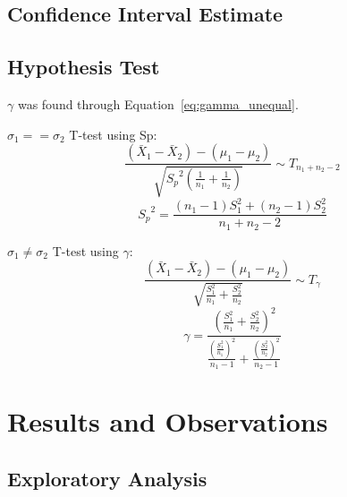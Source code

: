 \documentclass{article}
\begin{document}
\subsection{Confidence Interval Estimate}



\subsection{Hypothesis Test}

$\gamma$ was found through Equation~\ref{eq:gamma_unequal}.


$\sigma_1 == \sigma_2$ T-test using Sp:
\begin{equation}
	\frac{(\bar{X}_1 - \bar{X}_2) - (\mu_1 - \mu_2)}{\sqrt{{S_p}^2
	\left(\frac{1}{n_1} + \frac{1}{n_2} \right)}} \sim T_{n_1 + n_2 -2}
	\label{eq:t-test_equal}
\end{equation}
\begin{equation}
	{S_p}^2 = \frac{(n_1 - 1) S_1^2 + (n_2 -1) S_2^2}{n_1 + n_2 -2}
	\label{eq:pool_sample_variance}
\end{equation}

\noindent $\sigma_1 \neq \sigma_2$ T-test using $\gamma$:
\begin{equation}
	\frac{(\bar{X}_1 - \bar{X}_2) - (\mu_1 - \mu_2)}{\sqrt{\frac{S_1^2}{n_1} +
	\frac{S_2^2}{n_2}}} \sim T_\gamma
	\label{eq:t-test_unequal}
\end{equation}
\begin{equation}
	\gamma = \frac{\left(\frac{S_1^2}{n_1} + \frac{S_2^2}{n_2}
	\right)^2}{\frac{\left(\frac{S_1^2}{n_1} \right)^2}{n_1 - 1} +
	\frac{\left(\frac{S_2^2}{n_2} \right)^2}{n_2 - 1}}
	\label{eq:gamma_unequal}
\end{equation}


\section{Results and Observations}
\subsection{Exploratory Analysis}
\end{document}
